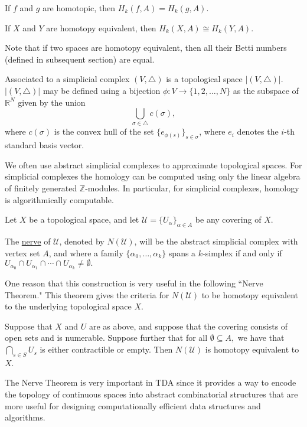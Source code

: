 \begin{thm}
	If $f$ and $g$ are homotopic, then $H_k(f,A) = H_k(g,A).$ 
	
	If $X$ and $Y$ are homotopy equivalent, then $H_k(X,A) \cong H_k(Y,A) $.
	
	Note that if two spaces are homotopy equivalent, then all their Betti numbers (defined in subsequent section) are equal.
\end{thm}
\begin{defn}
    Associated to a simplicial complex $(V, \triangle)$ is a topological space $|(V,\triangle)|$. $|(V,\triangle)|$ may be defined using a bijection $\phi : V \to \{1, 2, \dots,N\}$ as the subspace of $\mathbb{R}^N$ given by the union 
	$$\bigcup_{\sigma \in \triangle} c(\sigma),$$
	where $c(\sigma)$ is the convex hull of the set $\{e_{\phi(s)}\}_{s\in \sigma}$, where $e_i$ denotes the $i$-th standard basis vector.

	 We often use abstract simplicial complexes to approximate topological spaces. For simplicial complexes the homology can be computed using only the linear algebra of finitely generated $\mathbb{Z}$-modules. In particular, for simplicial complexes, homology is algorithmically computable.
\end{defn}	
	
\begin{defn}[Nerve]
	Let $X$ be a topological space, and let $\mathcal{U} = \{U_\alpha\}_{\alpha\in A}$ be any covering of $X$. 
	
	The \underline{nerve} of $\mathcal{U}$, denoted by $N(\mathcal{U})$, will be the abstract simplicial complex with vertex set $A$, and where a family $\{\alpha_0, \dots, \alpha_k\}$ spans a $k$-simplex if and only if $U_{\alpha_0}\cap U_{\alpha_1} \cap \cdots \cap U_{\alpha_k} \neq \emptyset.$
\end{defn}

One reason that this construction is very useful in the following ``Nerve Theorem." This theorem gives the criteria for $N(\mathcal{U})$ to be homotopy equivalent to the underlying topological space $X$.

\begin{thm}
Suppose that $X$ and $U$ are as above, and suppose that the covering consists of open sets and is numerable. Suppose further that for all $\emptyset \subseteq A,$ we have that $\bigcap_{s\in S} U_s$ is either contractible or empty. Then $N(\mathcal{U})$ is homotopy equivalent to $X$.
\end{thm}
The Nerve Theorem is very important in TDA since it provides a way to encode the topology of continuous spaces into abstract combinatorial structures that are more useful for designing computationally efficient data structures and algorithms.

